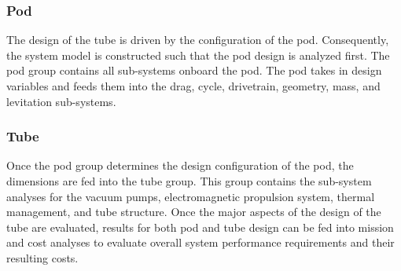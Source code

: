 \subsubsection{Pod}
	 The design of the tube is driven by the configuration of the pod. Consequently, the system model is constructed such that the pod design is analyzed first. The pod group contains all sub-systems onboard the pod. The pod takes in design variables and feeds them into the drag, cycle, drivetrain, geometry, mass, and levitation sub-systems.
\subsubsection{Tube}
	Once the pod group determines the design configuration of the pod, the dimensions are fed into the tube group. This group contains the sub-system analyses for the vacuum pumps, electromagnetic propulsion system, thermal management, and tube structure. Once the major aspects of the design of the tube are evaluated, results for both pod and tube design can be fed into mission and cost analyses to evaluate overall system performance requirements and their resulting costs.
